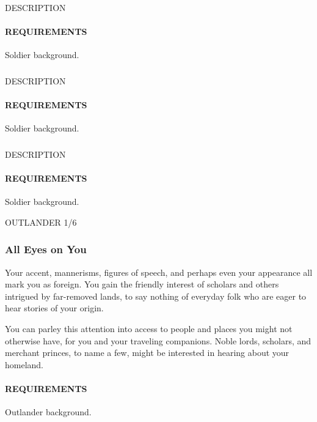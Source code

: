     \subsubsection{} \label{feat::NAME}
    DESCRIPTION
    \paragraph{REQUIREMENTS} Soldier background.

    \subsubsection{} \label{feat::NAME}
    DESCRIPTION
    \paragraph{REQUIREMENTS} Soldier background.

    \subsubsection{} \label{feat::NAME}
    DESCRIPTION
    \paragraph{REQUIREMENTS} Soldier background.

OUTLANDER 1/6
    \subsubsection{All Eyes on You} \label{feat::alleyesonyou}
    Your accent, mannerisms, figures of speech, and perhaps even your appearance all mark you as foreign.
    You gain the friendly interest of scholars and others intrigued by far-removed lands, to say nothing of everyday folk who are eager to hear stories of your origin.

    You can parley this attention into access to people and places you might not otherwise have, for you and your traveling companions.
    Noble lords, scholars, and merchant princes, to name a few, might be interested in hearing about your homeland.
    \paragraph{REQUIREMENTS} Outlander background.

